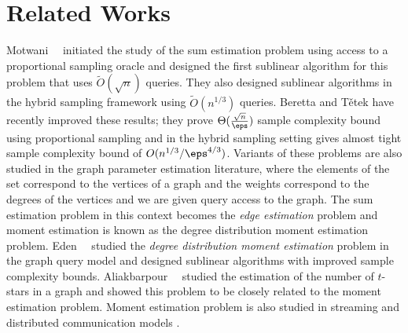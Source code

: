\section{Related Works}
Motwani~\etal~\cite{MPX2007} initiated the study of the sum estimation problem using access to a proportional sampling oracle and designed the first sublinear algorithm for this problem that uses $\tilde{O}(\sqrt{n})$ queries. They also designed sublinear algorithms in the hybrid sampling framework using $\tilde{O}(n^{1/3})$ queries. Beretta and T{\v{e}}tek \cite{BT2022} have recently improved these results; they prove $\Theta(\frac{\sqrt{n}}{\eps})$ sample complexity bound using proportional sampling and in the hybrid sampling setting gives almost tight sample complexity bound of $O(n^{1/3}/\eps^{4/3})$. Variants of these problems are also studied in the graph parameter estimation literature, where the elements of the set correspond to the vertices of a graph and the weights correspond to the degrees of the vertices and we are given query access to the graph. The sum estimation problem in this context becomes the {\it edge estimation} problem and moment estimation is known as the degree distribution moment estimation problem. Eden~\etal~\cite{ERS2018,ERS2019} studied the {\it degree distribution moment estimation} problem in the graph query model and designed sublinear algorithms with improved sample complexity bounds. Aliakbarpour~\etal~\cite{ABGPRY2018} studied the estimation of the number of $t$-stars in a graph and showed this problem to be closely related to the moment estimation problem. Moment estimation problem is also studied in streaming and distributed communication models \cite{AMS1999,JW2023}.

%